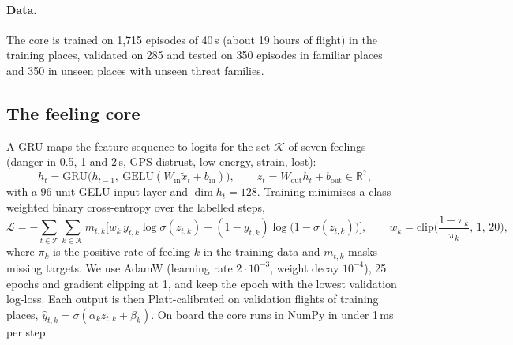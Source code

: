\documentclass[10pt]{article}
\begin{document}
\paragraph{Data.} The core is trained on 1,715 episodes of 40\,s (about 19 hours of flight) in the training places, validated on
285 and tested on 350 episodes in familiar places and 350 in unseen places with unseen threat families.

\subsection{The feeling core}
A GRU \citep{cho2014gru} maps the feature sequence to logits for the set $\mathcal K$ of seven feelings (danger in 0.5, 1 and
2\,s, GPS distrust, low energy, strain, lost):
\begin{equation}\label{eq:gru}
h_t=\mathrm{GRU}\big(h_{t-1},\ \mathrm{GELU}(W_{\mathrm{in}}\tilde x_t+b_{\mathrm{in}})\big),\qquad z_t=W_{\mathrm{out}}h_t+b_{\mathrm{out}}\in\mathbb{R}^{7},
\end{equation}
with a 96-unit GELU \citep{hendrycks2016gelu} input layer and $\dim h_t=128$. Training minimises a class-weighted binary cross-entropy over the labelled steps,
\begin{equation}
\mathcal L=-\sum_{t\in\mathcal T}\sum_{k\in\mathcal K} m_{t,k}\Big[w_k\,y_{t,k}\log\sigma(z_{t,k})+(1-y_{t,k})\log\big(1-\sigma(z_{t,k})\big)\Big],
\qquad w_k=\mathrm{clip}\Big(\frac{1-\pi_k}{\pi_k},\,1,\,20\Big),
\end{equation}
where $\pi_k$ is the positive rate of feeling $k$ in the training data and $m_{t,k}$ masks missing targets. We use AdamW
\citep{loshchilov2019adamw} (learning rate $2\cdot10^{-3}$, weight decay $10^{-4}$), 25 epochs and gradient clipping at 1, and keep
the epoch with the lowest validation log-loss. Each output is then Platt-calibrated \citep{platt1999} on validation flights of
training places, $\hat y_{t,k}=\sigma(\alpha_k z_{t,k}+\beta_k)$. On board the core runs in NumPy in under 1\,ms per step.
\end{document}

